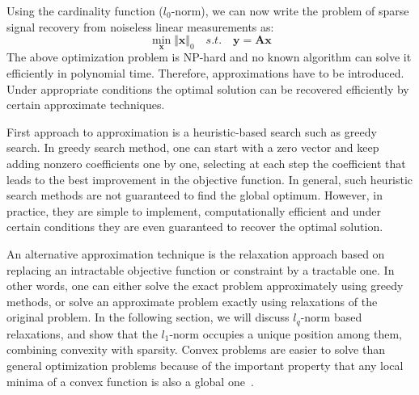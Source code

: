 \documentclass[journal]{IEEEtran}
\begin{document}

Using the cardinality function ($l_0$-norm), we can now write the problem of sparse signal recovery from noiseless linear measurements as:
%
\begin{equation}
	\min_{\boldsymbol{x}}\Vert \boldsymbol{x}\Vert_0 \quad s.t. \quad \boldsymbol{y}=\boldsymbol{A} \boldsymbol{x}
\end{equation}
%
The above optimization problem is NP-hard and no known algorithm can solve it efficiently in polynomial time. Therefore, approximations have to be introduced. Under appropriate conditions the optimal solution can be recovered efficiently by certain approximate techniques.

First approach to approximation is a heuristic-based search such as greedy search. In greedy search method, one can start with a zero vector and keep adding nonzero coefficients one by one, selecting at each step the coefficient that leads to the best improvement in the objective function. In general, such heuristic search methods are not guaranteed to find the global optimum. However, in practice, they are simple to implement, computationally efficient and under certain conditions they are even guaranteed to recover the optimal solution.

An alternative approximation technique is the relaxation approach based on replacing an intractable objective function or constraint by a tractable one. In other words, one can either solve the exact problem approximately using greedy methods, or solve an approximate problem exactly using relaxations of the original problem. In the following section, we will discuss $l_q$-norm based relaxations, and show that the $l_1$-norm occupies a unique position among them, combining convexity with sparsity. Convex problems are easier to solve than general optimization problems because of the important property that any local minima of a convex function is also a global one~\cite{Rish2015}.
\end{document}
